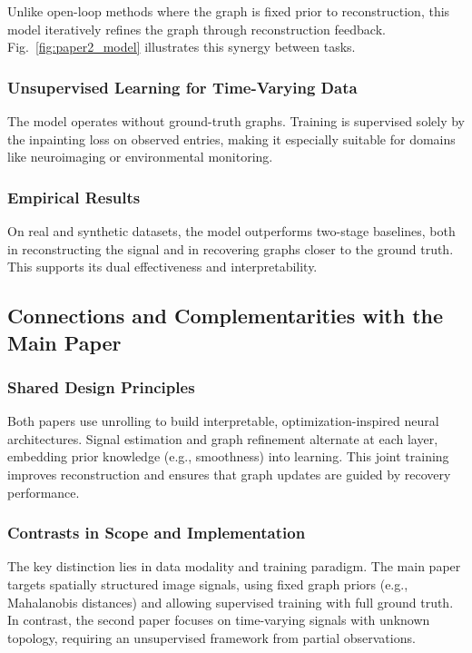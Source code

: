 \documentclass{article}
\theoremstyle{plain}
\theoremstyle{definition}
\theoremstyle{remark}
\begin{document}
Unlike open-loop methods where the graph is fixed prior to reconstruction, this model iteratively refines the graph through reconstruction feedback. Fig.~\ref{fig:paper2_model} illustrates this synergy between tasks.

\subsubsection{Unsupervised Learning for Time-Varying Data}

The model operates without ground-truth graphs. Training is supervised solely by the inpainting loss on observed entries, making it especially suitable for domains like neuroimaging or environmental monitoring.

\subsubsection{Empirical Results}

On real and synthetic datasets, the model outperforms two-stage baselines, both in reconstructing the signal and in recovering graphs closer to the ground truth. This supports its dual effectiveness and interpretability.

\subsection{Connections and Complementarities with the Main Paper}

\subsubsection{Shared Design Principles}

Both papers use unrolling to build interpretable, optimization-inspired neural architectures. Signal estimation and graph refinement alternate at each layer, embedding prior knowledge (e.g., smoothness) into learning. This joint training improves reconstruction and ensures that graph updates are guided by recovery performance.


\subsubsection{Contrasts in Scope and Implementation}

The key distinction lies in data modality and training paradigm. The main paper targets spatially structured image signals, using fixed graph priors (e.g., Mahalanobis distances) and allowing supervised training with full ground truth. In contrast, the second paper focuses on time-varying signals with unknown topology, requiring an unsupervised framework from partial observations.
\end{document}

